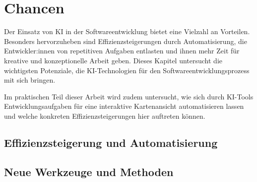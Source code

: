 \chapter{Chancen}
Der Einsatz von KI in der Softwareentwicklung bietet eine Vielzahl an Vorteilen. Besonders hervorzuheben sind Effizienzsteigerungen durch Automatisierung, die Entwickler:innen von repetitiven Aufgaben entlasten und ihnen mehr Zeit für kreative und konzeptionelle Arbeit geben. Dieses Kapitel untersucht die wichtigsten Potenziale, die KI-Technologien für den Softwareentwicklungsprozess mit sich bringen.

Im praktischen Teil dieser Arbeit wird zudem untersucht, wie sich durch KI-Tools Entwicklungsaufgaben für eine interaktive Kartenansicht automatisieren lassen und welche konkreten Effizienzsteigerungen hier auftreten können.
\section{Effizienzsteigerung und Automatisierung}


\section{Neue Werkzeuge und Methoden}



